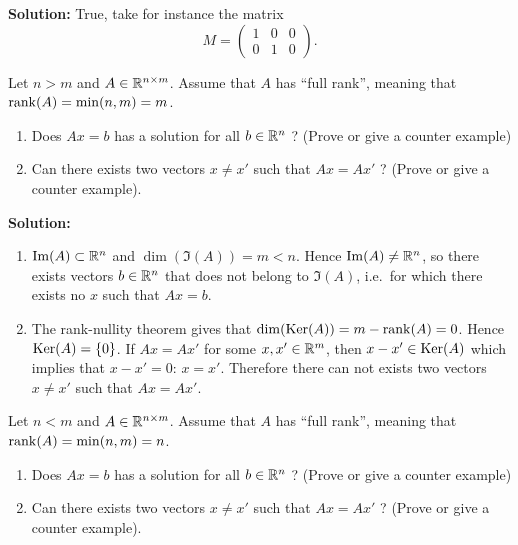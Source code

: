 \documentclass[11pt,nocut]{article}
\begin{document}
\textbf{Solution:}
True, take for instance the matrix
$$
M = 
\begin{pmatrix}
	1 & 0 & 0 \\
	0 & 1 & 0
\end{pmatrix}.
$$

\vspace{0.2cm}

\begin{problem}
	Let $n>m$ and $A \in \mathbb{R}^{n \times m}$. Assume that $A$ has ``full rank'', meaning that ${{\rm rank}}(A)=\min(n,m)=m$.
	\begin{enumerate}
		\item Does $Ax=b$ has a solution for all $b \in \mathbb{R}^n$ ? (Prove or give a counter example)
		\item Can there exists two vectors $x \neq x'$ such that $Ax=Ax'$ ? (Prove or give a counter example).
	\end{enumerate}
\end{problem}

\textbf{Solution:}

	\begin{enumerate}
		\item ${{\rm Im}}(A) \subset \mathbb{R}^n$ and $\dim(\Im(A)) = m < n$. Hence ${{\rm Im}}(A) \neq \mathbb{R}^n$, so there exists vectors $b \in \mathbb{R}^n$ that does not belong to $\Im(A)$, i.e.\ for which there exists no $x$ such that $Ax=b$.
		\item The rank-nullity theorem gives that ${{\rm dim}}({{\rm Ker}}(A)) = m - {{\rm rank}}(A) = 0$. Hence ${{\rm Ker}}(A) = \{0\}$. If $Ax = Ax'$ for some $x,x' \in \mathbb{R}^m$, then $x-x' \in {{\rm Ker}}(A)$ which implies that $x-x' = 0$: $x=x'$.
		Therefore there can not exists two vectors $x \neq x'$ such that $Ax=Ax'$.
	\end{enumerate}

\vspace{0.2cm}

\begin{problem}
	Let $n<m$ and $A \in \mathbb{R}^{n \times m}$. Assume that $A$ has ``full rank'', meaning that ${{\rm rank}}(A)=\min(n,m)=n$.
	\begin{enumerate}
		\item Does $Ax=b$ has a solution for all $b \in \mathbb{R}^n$ ? (Prove or give a counter example)
		\item Can there exists two vectors $x \neq x'$ such that $Ax=Ax'$ ? (Prove or give a counter example).
	\end{enumerate}
\end{problem}
\end{document}
